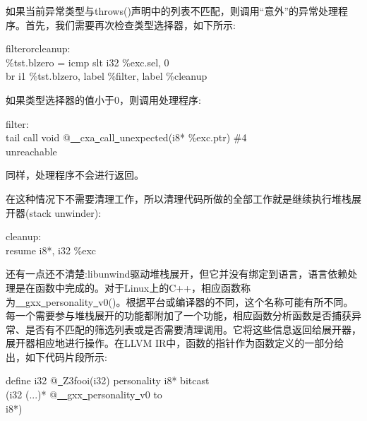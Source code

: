 如果当前异常类型与throws()声明中的列表不匹配，则调用“意外”的异常处理程序。首先，我们需要再次检查类型选择器，如下所示:\par

\begin{tcolorbox}[colback=white,colframe=black]
filterorcleanup: \\
\%tst.blzero = icmp slt i32 \%exc.sel, 0 \\
br i1 \%tst.blzero, label \%filter, label \%cleanup
\end{tcolorbox}

如果类型选择器的值小于0，则调用处理程序:

\begin{tcolorbox}[colback=white,colframe=black]
filter: \\
tail call void @\underline{~~}cxa\underline{~}call\underline{~}unexpected(i8* \%exc.ptr) \#4 \\
unreachable
\end{tcolorbox}

同样，处理程序不会进行返回。\par

在这种情况下不需要清理工作，所以清理代码所做的全部工作就是继续执行堆栈展开器(stack unwinder):\par

\begin{tcolorbox}[colback=white,colframe=black]
cleanup: \\
resume { i8*, i32 } \%exc
\end{tcolorbox}

还有一点还不清楚:libunwind驱动堆栈展开，但它并没有绑定到语言，语言依赖处理是在函数中完成的。对于Linux上的C++，相应函数称为\underline{~~}gxx\underline{~}personality\underline{~}v0()。根据平台或编译器的不同，这个名称可能有所不同。每一个需要参与堆栈展开的功能都附加了一个功能，相应函数分析函数是否捕获异常、是否有不匹配的筛选列表或是否需要清理调用。它将这些信息返回给展开器，展开器相应地进行操作。在LLVM IR中，函数的指针作为函数定义的一部分给出，如下代码片段所示:\par

\begin{tcolorbox}[colback=white,colframe=black]
define i32 @\underline{~}Z3fooi(i32) personality i8* bitcast \\
\hspace*{3cm}(i32 (...)* @\underline{~~}gxx\underline{~}personality\underline{~}v0 to \\
\hspace*{3cm}i8*)
\end{tcolorbox}

